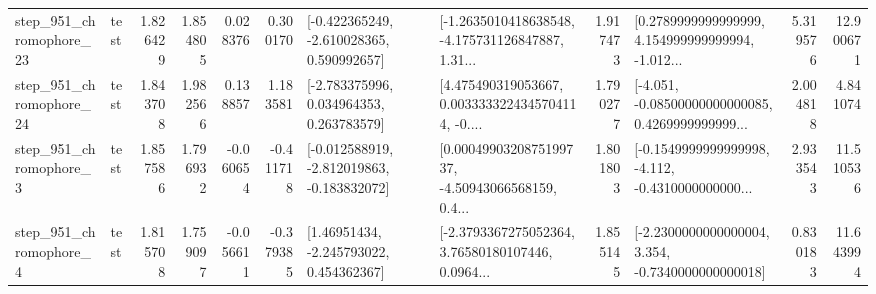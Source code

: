 \begin{tabular}{llrrrrllrlrr}
  step\_951\_chromophore\_23 &      test &      1.826429 &    1.854805 &      0.028376 &  0.300170 &   [-0.422365249, -2.610028365, 0.590992657] &  [-1.2635010418638548, -4.175731126847887, 1.31... &       1.917473 &  [0.2789999999999999, 4.154999999999994, -1.012... &            5.319576 &         12.900671 \\
  step\_951\_chromophore\_24 &      test &      1.843708 &    1.982566 &      0.138857 &  1.183581 &    [-2.783375996, 0.034964353, 0.263783579] &  [4.475490319053667, 0.0033333224345704114, -0.... &       1.790277 &  [-4.051, -0.08500000000000085, 0.4269999999999... &            2.004818 &          4.841074 \\
   step\_951\_chromophore\_3 &      test &      1.857586 &    1.796932 &     -0.060654 & -0.411718 &  [-0.012588919, -2.812019863, -0.183832072] &  [0.0004990320875199737, -4.50943066568159, 0.4... &       1.801803 &  [-0.1549999999999998, -4.112, -0.4310000000000... &            2.933543 &         11.510536 \\
   step\_951\_chromophore\_4 &      test &      1.815708 &    1.759097 &     -0.056611 & -0.379385 &     [1.46951434, -2.245793022, 0.454362367] &  [-2.3793367275052364, 3.76580180107446, 0.0964... &       1.855145 &  [-2.2300000000000004, 3.354, -0.7340000000000018] &            0.830183 &         11.643994 \\
\bottomrule
\end{tabular}


